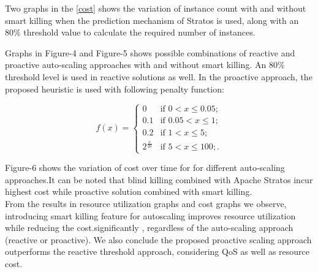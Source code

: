 Two graphs in the \ref{cost} shows the variation of instance count with and without smart killing when the prediction mechanism of Stratos is used, along with an 80\% threshold value to calculate the required number of instances.

Graphs in Figure-4  and Figure-5 shows possible combinations of reactive and proactive auto-scaling approaches with and without smart killing. An 80\% threshold level is used in reactive solutions as well. In the proactive approach, the proposed heuristic is used with following penalty function:

$$f(x) = \begin{cases} 
0 & \text{if $0 < x \le 0.05$}; \\
0.1 & \text{if $0.05 < x \le 1$}; \\
0.2 & \text{if $1 < x \le 5$};\\
2^{\frac{x}{20}} & \text{if $5 < x \le 100$};.\end{cases} $$


Figure-6 shows the variation of cost over time for for different auto-scaling approaches.It can be noted that blind killing combined with Apache Stratos incur highest cost while proactive solution combined with smart killing.\\

From the results in resource utilization graphs and cost graphs we observe, introducing smart killing feature for autoscaling  improves resource utilization while reducing the cost.significantly , regardless of the auto-scaling approach (reactive or proactive). We also conclude the proposed proactive scaling approach outperforms the reactive threshold approach, considering QoS as well as resource cost.
